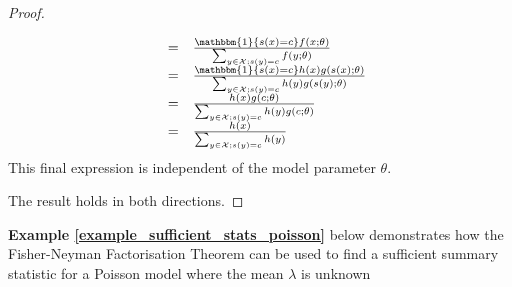 \documentclass[bibliography=totoc,11pt,a4paper,margin=0]{article}
\newcommand*{\indexed}{\mathbbm{1}}
\theoremstyle{break}
\begin{document}
\begin{box_theorem}
\begin{proof}
\begin{itemize}
\[\begin{array}{rcl}
          &=&\frac{\indexed\{s(x)=c\}f(x;\theta)}{\sum_{y\in\mathcal{X};s(y)=c}f(y;\theta)}\\
          &=&\frac{\indexed\{s(x)=c\}h(x)g(s(x);\theta)}{\sum_{y\in\mathcal{X};s(y)=c}h(y)g(s(y);\theta)}\\
          &=&\frac{h(x)g(c;\theta)}{\sum_{y\in\mathcal{X};s(y)=c}h(y)g(c;\theta)}\\
          &=&\frac{h(x)}{\sum_{y\in\mathcal{X};s(y)=c}h(y)}
        \end{array}\]
        This final expression is independent of the model parameter $\theta$.
      \end{itemize}
      The result holds in both directions.
    \end{proof}
  \end{box_theorem}

  \par \textbf{Example \ref{example_sufficient_stats_poisson}} below demonstrates how the Fisher-Neyman Factorisation Theorem can be used to find a sufficient summary statistic for a Poisson model where the mean $\lambda$ is unknown
\end{document}
